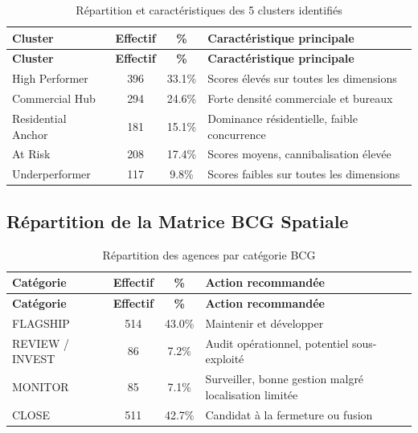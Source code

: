 \documentclass[11pt,a4paper,twoside]{report}
\begin{document}
\begin{center}
\small
\renewcommand{\arraystretch}{1.15}
\begin{longtable}{|p{4cm}|c|c|p{5.5cm}|}
\caption{Répartition et caractéristiques des 5 clusters identifiés} \label{tab:clusters_annex} \\
\hline
\textbf{Cluster} & \textbf{Effectif} & \textbf{\%} & \textbf{Caractéristique principale} \\
\hline
\endfirsthead
\hline
\textbf{Cluster} & \textbf{Effectif} & \textbf{\%} & \textbf{Caractéristique principale} \\
\hline
\endhead
\hline
\endfoot
\hline
\endlastfoot

High Performer & 396 & 33.1\% & Scores élevés sur toutes les dimensions \\
\hline
Commercial Hub & 294 & 24.6\% & Forte densité commerciale et bureaux \\
\hline
Residential Anchor & 181 & 15.1\% & Dominance résidentielle, faible concurrence \\
\hline
At Risk & 208 & 17.4\% & Scores moyens, cannibalisation élevée \\
\hline
Underperformer & 117 & 9.8\% & Scores faibles sur toutes les dimensions \\
\hline

\end{longtable}
\end{center}

\subsection{Répartition de la Matrice BCG Spatiale}

\begin{center}
\small
\renewcommand{\arraystretch}{1.15}
\begin{longtable}{|p{4cm}|c|c|p{5.5cm}|}
\caption{Répartition des agences par catégorie BCG} \label{tab:bcg_annex} \\
\hline
\textbf{Catégorie} & \textbf{Effectif} & \textbf{\%} & \textbf{Action recommandée} \\
\hline
\endfirsthead
\hline
\textbf{Catégorie} & \textbf{Effectif} & \textbf{\%} & \textbf{Action recommandée} \\
\hline
\endhead
\hline
\endfoot
\hline
\endlastfoot

FLAGSHIP & 514 & 43.0\% & Maintenir et développer \\
\hline
REVIEW / INVEST & 86 & 7.2\% & Audit opérationnel, potentiel sous-exploité \\
\hline
MONITOR & 85 & 7.1\% & Surveiller, bonne gestion malgré localisation limitée \\
\hline
CLOSE & 511 & 42.7\% & Candidat à la fermeture ou fusion \\
\hline

\end{longtable}
\end{center}
\end{document}

